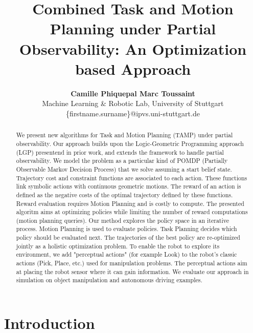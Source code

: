 \documentclass[conference]{IEEEtran}
\begin{document}
\title{Combined Task and Motion Planning under Partial Observability: An Optimization based Approach}

\author{\textbf{Camille Phiquepal \space\space\space\space\space\space\space\space\space\space\space\space Marc Toussaint}\\
Machine Learning \& Robotic Lab, University of Stuttgart\\
\{firstname.surname\}@ipvs.uni-stuttgart.de
       }

\maketitle


\begin{abstract}
We present new algorithms for Task and Motion Planning (TAMP) under partial observability. Our approach builds upon the Logic-Geometric Programming approach (LGP) presentend in prior work, and extends the framework to handle partial observability. We model the problem as a particular kind of POMDP (Partially Observable Markov Decision Process) that we solve assuming a start belief state. Trajectory cost and constraint functions are associated to each action. These functions link symbolic actions with continuous geometric motions. The reward of an action is defined as the negative costs of the optimal trajectory defined by these functions. Reward evaluation requires Motion Planning and is costly to compute. The presented algoritm aims at optimizing policies while limiting the number of reward computations (motion planning queries). Our method explores the policy space in an iterative process. Motion Planning is used to evaluate policies. Task Planning decides which policy should be evaluated next. The trajectories of the best policy are re-optimized jointly as a holistic optimization problem. To enable the robot to explore its environment, we add "perceptual actions" (for example Look) to the robot’s classic actions (Pick, Place, etc.) used for manipulation problems. The perceptual actions aim at placing the robot sensor where it can gain information. We evaluate our approach in simulation on object manipulation and autonomous driving examples.
\end{abstract}

\IEEEpeerreviewmaketitle
\section{Introduction}
\end{document}
